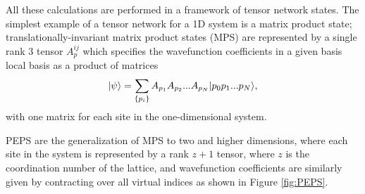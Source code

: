 All these calculations are performed in a framework of tensor network states.
The simplest example of a tensor network for a 1D system is a matrix
product state; translationally-invariant matrix product states (MPS)
are represented by a single rank 3 tensor $A_p^{ij}$ which specifies
the wavefunction coefficients in a given basis local basis as a
product of matrices $$\vert \psi \rangle = \sum\limits_{\{p_i\}} A_{p_1}
A_{p_2} ... A_{p_N} \vert p_0 p_1 ... p_N \rangle,$$ with one matrix for each
site in the one-dimensional system.

PEPS are the generalization of MPS to two and higher dimensions, where
each site in the system is represented by a rank $z+1$ tensor, where
$z$ is the coordination number of the lattice, and wavefunction
coefficients are similarly given by contracting over all virtual
indices as shown in Figure \ref{fig:PEPS}.\cite{verstraete2004} 
